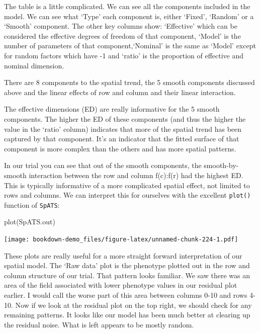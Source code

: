 \documentclass[
]{book}
\newenvironment{Shaded}{\begin{snugshade}}{\end{snugshade}}
\newcommand{\FunctionTok}[1]{\textcolor[rgb]{0.00,0.00,0.00}{#1}}
\newcommand{\NormalTok}[1]{#1}
\begin{document}
The table is a little complicated. We can see all the components included in the model. We can see what `Type' each component is, either `Fixed', `Random' or a `Smooth' component. The other key columns show: `Effective' which can be considered the effective degrees of freedom of that component, `Model' is the number of parameters of that component,`Nominal' is the same as `Model' except for random factors which have -1 and `ratio' is the proportion of effective and nominal dimension.

There are 8 components to the spatial trend, the 5 smooth components discussed above and the linear effects of row and column and their linear interaction.

The effective dimensions (ED) are really informative for the 5 smooth components. The higher the ED of these components (and thus the higher the value in the `ratio' column) indicates that more of the spatial trend has been captured by that component. It's an indicator that the fitted surface of that component is more complex than the others and has more spatial patterns.

In our trial you can see that out of the smooth components, the smooth-by-smooth interaction between the row and column f(c):f(r) had the highest ED. This is typically informative of a more complicated spatial effect, not limited to rows and columns. We can interpret this for ourselves with the excellent \texttt{plot()} function of \texttt{SpATS}:

\begin{Shaded}
\begin{Highlighting}[]
\FunctionTok{plot}\NormalTok{(SpATS.out)}
\end{Highlighting}
\end{Shaded}

\texttt{[image: bookdown-demo\_files/figure-latex/unnamed-chunk-224-1.pdf]}

These plots are really useful for a more straight forward interpretation of our spatial model. The `Raw data' plot is the phenotype plotted out in the row and column structure of our trial. That pattern looks familiar. We saw there was an area of the field associated with lower phenotype values in our residual plot earlier. I would call the worse part of this area between columns 0-10 and rows 4-10. Now if we look at the residual plot on the top right, we should check for any remaining patterns. It looks like our model has been much better at clearing up the residual noise. What is left appears to be mostly random.
\end{document}
